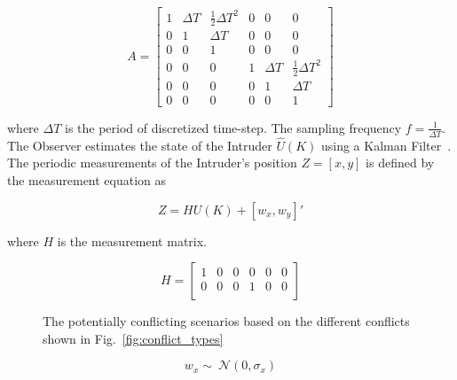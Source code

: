 \documentclass[journal]{IEEEtran}
\begin{document}
\begin{equation}
A = \begin{bmatrix}
	1 & \Delta T & \frac{1}{2}\Delta T^{2} & 0 & 0 & 0\\	
	0 &  1 & \Delta T & 0 & 0 & 0\\	
	0 &  0 & 1 & 0 & 0 & 0 \\
	0 &  0 & 0 & 1 & \Delta T & \frac{1}{2}\Delta T^{2} \\
	0 &  0 & 0 & 0 & 1 & \Delta T \\
	0 &  0 & 0 & 0 & 0 & 1 
\end{bmatrix}
\label{eq:transition_matrix}
\end{equation}

\noindent where $\Delta T$ is the period of discretized time-step. The sampling frequency $f = \frac{1}{\Delta T}$. The Observer estimates the state of the Intruder $\hat{U}(K)$ using a Kalman Filter~\cite{bar2004estimation}. The periodic measurements of the Intruder's position $Z = [x, y]$ is defined by the measurement equation as 

\begin{equation}
	Z = HU(K) + [w_{x},w_{y}]'
	\label{eq:measurement}
\end{equation}

\noindent where $H$ is the measurement matrix.

\begin{equation}
H = \begin{bmatrix}
1 & 0 & 0 & 0 & 0 & 0\\	
0 & 0 & 0 & 1 & 0 & 0\\	
\end{bmatrix}
 \label{eq:measurement_matrix} 
\end{equation}

\begin{figure}[h]\centering
	\hfill
\caption{The potentially conflicting scenarios based on the different conflicts shown in Fig.~\ref{fig:conflict_types}}
	\label{fig:potential_conflict_scenarios}
\end{figure}

\begin{equation}
w_{x} \sim{~} \mathcal{N}(0,\sigma_{x})
\label{eq:noise_x}
\end{equation}
\end{document}
